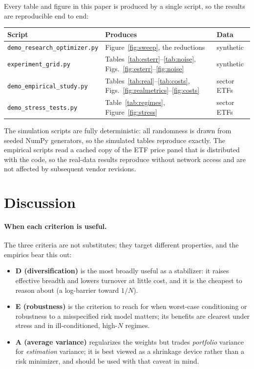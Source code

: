 \documentclass[11pt]{article}
\begin{document}
Every table and figure in this paper is produced by a single script, so the
results are reproducible end to end:

\begin{center}
\begin{tabular}{lll}
\toprule
\textbf{Script} & \textbf{Produces} & \textbf{Data} \\
\midrule
\texttt{demo\_research\_optimizer.py} & Figure~\ref{fig:sweep}, the reductions & synthetic \\
\texttt{experiment\_grid.py} & Tables~\ref{tab:esterr}--\ref{tab:noise}, Figs.~\ref{fig:esterr}--\ref{fig:noise} & synthetic \\
\texttt{demo\_empirical\_study.py} & Tables~\ref{tab:real}--\ref{tab:costs}, Figs.~\ref{fig:realmetrics}--\ref{fig:costs} & sector ETFs \\
\texttt{demo\_stress\_tests.py} & Table~\ref{tab:regimes}, Figure~\ref{fig:stress} & sector ETFs \\
\bottomrule
\end{tabular}
\end{center}

The simulation scripts are fully deterministic: all randomness is drawn from
seeded NumPy generators, so the simulated tables reproduce exactly. The
empirical scripts read a cached copy of the ETF price panel that is distributed
with the code, so the real-data results reproduce without network access and are
not affected by subsequent vendor revisions.

\section{Discussion}
\label{sec:discussion}
\paragraph{When each criterion is useful.} The three criteria are not
substitutes; they target different properties, and the empirics bear this out:
\begin{itemize}[leftmargin=1.4em,itemsep=0.2em]
  \item \textbf{D (diversification)} is the most broadly useful as a stabilizer:
    it raises effective breadth and lowers turnover at little cost, and it is the
    cheapest to reason about (a log-barrier toward $1/N$).
  \item \textbf{E (robustness)} is the criterion to reach for when worst-case
    conditioning or robustness to a misspecified risk model matters; its benefits
    are clearest under stress and in ill-conditioned, high-$N$ regimes.
  \item \textbf{A (average variance)} regularizes the weights but trades
    \emph{portfolio} variance for \emph{estimation} variance; it is best viewed as
    a shrinkage device rather than a risk minimizer, and should be used with that
    caveat in mind.
\end{itemize}
\end{document}
